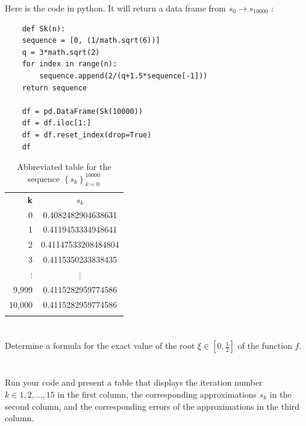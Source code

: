 \documentclass{article}
\begin{document}
Here is the code in python. It will return a data frame from $s_0\to s_10000$ :
\begin{verbatim}
    def Sk(n):
    sequence = [0, (1/math.sqrt(6))]
    q = 3*math.sqrt(2)
    for index in range(n):
        sequence.append(2/(q+1.5*sequence[-1]))
    return sequence

    df = pd.DataFrame(Sk(10000))
    df = df.iloc[1:]
    df = df.reset_index(drop=True)
    df
\end{verbatim}

\begin{table}[H]
    \centering
    \begin{tabular}{|r|c|}
        \Xhline{1 pt}
         \textbf{k}& \textbf{$s_k$}  \\
         \Xhline{1.5 pt}
         0 & 0.4082482904638631\\
         \Xhline{1 pt}
         1 & 0.4119453334948641\\
         \Xhline{1 pt}
         2 & 0.41147533208484804\\
         \Xhline{1 pt}
         3 & 0.4115350233838435\\
         \Xhline{1 pt}
         $\vdots$ & $\vdots$\\
          \Xhline{1 pt}
         9,999 & 0.4115282959774586\\
          \Xhline{1 pt}
         10,000 & 0.4115282959774586\\
         \Xhline{1 pt}
    \end{tabular}
    \caption{Abbreviated table for the sequence $\left\{ s_k\right\}_{k=0}^{10000}$}
    \label{tab:10sequence}
\end{table}


\section{}
Determine a formula for the exact value of the root $\xi \in \left[0,\frac{1}{2} \right]$ of the function $f$.
\vspace{10mm}


\section{}
Run your code and present a table that displays the iteration number $k \in {1,2,\dots,15}$ in the first column, the corresponding approximations $s_k$ in the second column, and the corresponding errors of the approximations in the third column.
\vspace{10mm}
\end{document}
